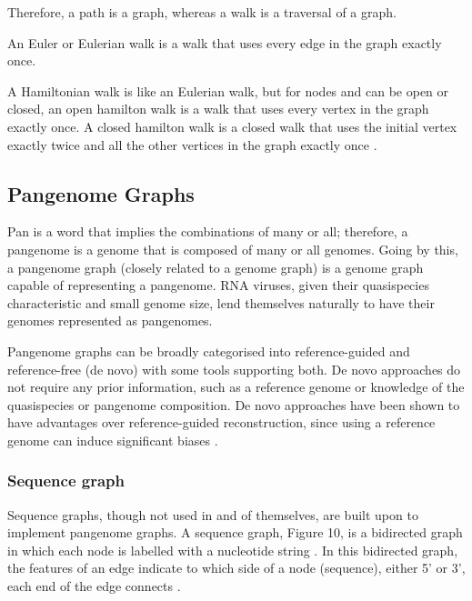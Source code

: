 \documentclass[10pt, a4paper]{article}
\begin{document}
Therefore, a path is a graph, whereas a walk is a traversal of a graph.

An Euler or Eulerian walk is a walk that uses every edge in the graph exactly
once.

A Hamiltonian walk is like an Eulerian walk, but for nodes and can be open or
closed, an open hamilton walk is a walk that uses every vertex in the graph
exactly once.
A closed hamilton walk is a closed walk that uses the initial vertex exactly
twice and all the other vertices in the graph exactly once
\cite{trudeauIntroductionGraphTheory1993}.

\newpage

\subsection{Pangenome Graphs}
\label{sec:org71236af}
Pan is a word that implies the combinations of many or all; therefore, a
pangenome is a genome that is composed of many or all genomes. Going by this, a
pangenome graph (closely related to a genome graph) is a genome graph capable of
representing a pangenome.
RNA viruses, given their quasispecies characteristic and small genome size,
lend themselves naturally to have their genomes represented as pangenomes.

Pangenome graphs can be broadly categorised into reference-guided and
reference-free (de novo) with some tools supporting both. De novo approaches do
not require any prior information, such as a reference genome or knowledge of
the quasispecies or pangenome composition. De novo approaches have been shown to
have advantages over reference-guided reconstruction, since using a reference
genome can induce significant biases \cite{baaijensStrainawareAssemblyGenomes2019}.

\subsubsection{Sequence graph}
\label{sec:org4b39031}
Sequence graphs, though not used in and of themselves, are built upon to
implement pangenome graphs.
A sequence graph, Figure 10, is a bidirected graph in which each node is
labelled with a nucleotide string \cite{patenGenomeGraphsEvolution2017}.
In this bidirected graph, the features of an edge indicate to which side of a
node (sequence), either 5’ or 3’, each end of the edge connects
\cite{novakGenomeGraphs2017}.
\end{document}
